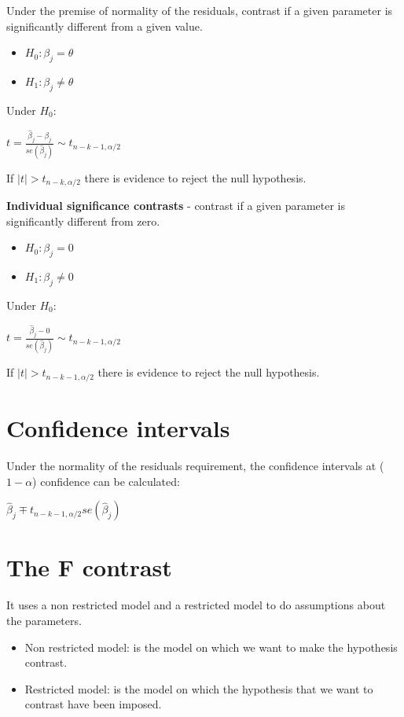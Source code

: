 \documentclass[10pt, a4paper, landscape]{extarticle}
\begin{document}
\begin{multicols}{3}
Under the premise of normality of the residuals, contrast if a given parameter is significantly different from a given value.

\begin{itemize}[leftmargin=*]
\item $H_0: \beta_j = \theta$
\item $H_1: \beta_j \neq \theta$
\end{itemize}

Under $H_0$:

$t = \frac{\hat{\beta}_j - \beta_j}{se(\hat{\beta}_j)} \sim t_{n-k-1, \alpha/2}$

If $\mid t \mid > t_{n-k, \alpha/2}$ there is evidence to reject the null hypothesis.

\textbf{Individual significance contrasts} - contrast if a given parameter is significantly different from zero.

\begin{itemize}[leftmargin=*]
\item $H_0: \beta_j = 0$
\item $H_1: \beta_j \neq 0$
\end{itemize}

Under $H_0$:

$t = \frac{\hat{\beta}_j - 0}{se(\hat{\beta}_j)} \sim t_{n-k-1, \alpha/2}$

If $\mid t \mid > t_{n-k-1, \alpha/2}$ there is evidence to reject the null hypothesis.

\section*{Confidence intervals}

Under the normality of the residuals requirement, the confidence intervals at ($1 - \alpha$) confidence can be calculated:

$\hat{\beta}_j \mp t_{n-k-1, \alpha/2} se(\hat{\beta}_j)$

\section*{The F contrast}

It uses a non restricted model and a restricted model to do assumptions about the parameters.

\begin{itemize}[leftmargin=*]
\item Non restricted model: is the model on which we want to make the hypothesis contrast.
\item Restricted model: is the model on which the hypothesis that we want to contrast have been imposed.
\end{itemize}


\end{multicols}
\end{document}
